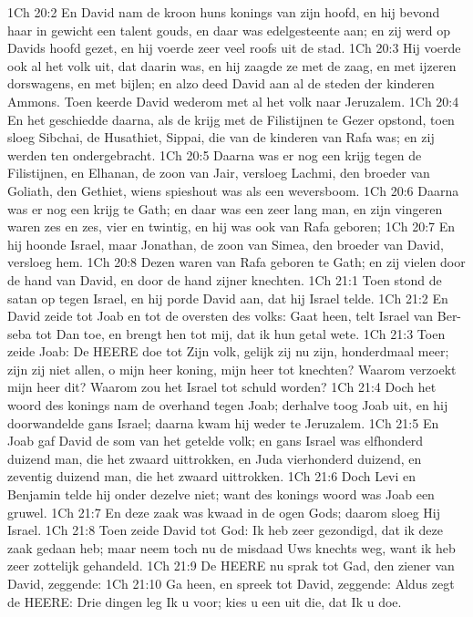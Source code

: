 1Ch 20:2  En David nam de kroon huns konings van zijn hoofd, en hij bevond haar in gewicht een talent gouds, en daar was edelgesteente aan; en zij werd op Davids hoofd gezet, en hij voerde zeer veel roofs uit de stad.
1Ch 20:3  Hij voerde ook al het volk uit, dat daarin was, en hij zaagde ze met de zaag, en met ijzeren dorswagens, en met bijlen; en alzo deed David aan al de steden der kinderen Ammons. Toen keerde David wederom met al het volk naar Jeruzalem.
1Ch 20:4  En het geschiedde daarna, als de krijg met de Filistijnen te Gezer opstond, toen sloeg Sibchai, de Husathiet, Sippai, die van de kinderen van Rafa was; en zij werden ten ondergebracht.
1Ch 20:5  Daarna was er nog een krijg tegen de Filistijnen, en Elhanan, de zoon van Jair, versloeg Lachmi, den broeder van Goliath, den Gethiet, wiens spieshout was als een weversboom.
1Ch 20:6  Daarna was er nog een krijg te Gath; en daar was een zeer lang man, en zijn vingeren waren zes en zes, vier en twintig, en hij was ook van Rafa geboren;
1Ch 20:7  En hij hoonde Israel, maar Jonathan, de zoon van Simea, den broeder van David, versloeg hem.
1Ch 20:8  Dezen waren van Rafa geboren te Gath; en zij vielen door de hand van David, en door de hand zijner knechten.
1Ch 21:1  Toen stond de satan op tegen Israel, en hij porde David aan, dat hij Israel telde.
1Ch 21:2  En David zeide tot Joab en tot de oversten des volks: Gaat heen, telt Israel van Ber-seba tot Dan toe, en brengt hen tot mij, dat ik hun getal wete.
1Ch 21:3  Toen zeide Joab: De HEERE doe tot Zijn volk, gelijk zij nu zijn, honderdmaal meer; zijn zij niet allen, o mijn heer koning, mijn heer tot knechten? Waarom verzoekt mijn heer dit? Waarom zou het Israel tot schuld worden?
1Ch 21:4  Doch het woord des konings nam de overhand tegen Joab; derhalve toog Joab uit, en hij doorwandelde gans Israel; daarna kwam hij weder te Jeruzalem.
1Ch 21:5  En Joab gaf David de som van het getelde volk; en gans Israel was elfhonderd duizend man, die het zwaard uittrokken, en Juda vierhonderd duizend, en zeventig duizend man, die het zwaard uittrokken.
1Ch 21:6  Doch Levi en Benjamin telde hij onder dezelve niet; want des konings woord was Joab een gruwel.
1Ch 21:7  En deze zaak was kwaad in de ogen Gods; daarom sloeg Hij Israel.
1Ch 21:8  Toen zeide David tot God: Ik heb zeer gezondigd, dat ik deze zaak gedaan heb; maar neem toch nu de misdaad Uws knechts weg, want ik heb zeer zottelijk gehandeld.
1Ch 21:9  De HEERE nu sprak tot Gad, den ziener van David, zeggende:
1Ch 21:10  Ga heen, en spreek tot David, zeggende: Aldus zegt de HEERE: Drie dingen leg Ik u voor; kies u een uit die, dat Ik u doe.

